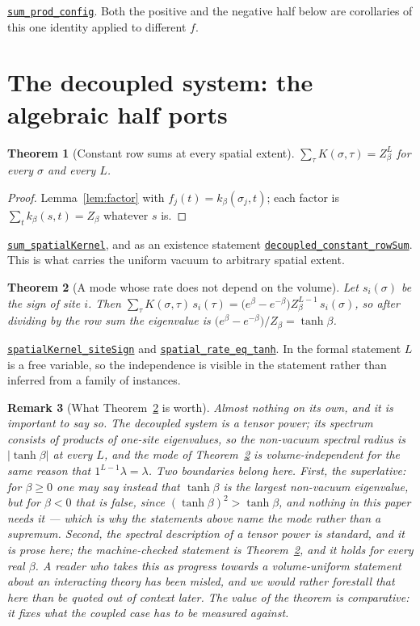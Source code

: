 \documentclass[11pt]{article}
\newtheorem{theorem}{Theorem}[section]
\newtheorem{remark}[theorem]{Remark}
\theoremstyle{definition}
\newcommand{\anchor}{d8187d7f9caa9ce93a58a70a382e98a239942afe}
\newcommand{\osline}[3]{%
  \href{https://github.com/lluiseriksson/THE-ERIKSSON-PROGRAMME/blob/\anchor/YangMills/OS/#1.lean\#L#2}{\nolinkurl{#3}}}
\begin{document}
\osline{SpatialExtent}{77}{sum\_prod\_config}.  Both the positive and the
negative half below are corollaries of this one identity applied to different
$f$.

\section{The decoupled system: the algebraic half ports}

\begin{theorem}[Constant row sums at every spatial extent]\label{thm:rows}
$\displaystyle\sum_{\tau} K(\sigma,\tau) = Z_\beta^{L}$ for every $\sigma$ and
every $L$.
\end{theorem}

\begin{proof}
Lemma~\ref{lem:factor} with $f_j(t)=k_\beta(\sigma_j,t)$; each factor is
$\sum_t k_\beta(s,t)=Z_\beta$ whatever $s$ is.
\end{proof}

\osline{SpatialExtent}{99}{sum\_spatialKernel}, and as an existence statement
\osline{SpatialExtent}{232}{decoupled\_constant\_rowSum}.  This is what carries
the uniform vacuum to arbitrary spatial extent.

\begin{theorem}[A mode whose rate does not depend on the volume]\label{thm:mode}
Let $s_i(\sigma)$ be the sign of site $i$.  Then
$\displaystyle\sum_\tau K(\sigma,\tau)\, s_i(\tau)
 = \bigl(e^{\beta}-e^{-\beta}\bigr) Z_\beta^{L-1}\, s_i(\sigma)$,
so after dividing by the row sum the eigenvalue is
$\bigl(e^{\beta}-e^{-\beta}\bigr)/Z_\beta=\tanh\beta$.
\end{theorem}

\osline{SpatialExtent}{129}{spatialKernel\_siteSign} and
\osline{SpatialExtent}{160}{spatial\_rate\_eq\_tanh}.  In the formal statement
$L$ is a free variable, so the independence is visible in the statement rather
than inferred from a family of instances.

\begin{remark}[What Theorem~\ref{thm:mode} is worth]\label{rem:empty}
Almost nothing on its own, and it is important to say so.  The decoupled system
is a tensor power; its spectrum consists of products of one-site eigenvalues, so
the non-vacuum spectral radius is $|\tanh\beta|$ at every $L$, and the mode of
Theorem~\ref{thm:mode} is volume-independent for the same reason that
$1^{L-1}\lambda=\lambda$.  Two boundaries belong here.  First, the superlative:
for $\beta\ge0$ one may say instead that $\tanh\beta$ is the largest non-vacuum
eigenvalue, but for $\beta<0$ that is false, since $(\tanh\beta)^{2}>\tanh\beta$,
and nothing in this paper needs it --- which is why the statements above name the
mode rather than a supremum.  Second, the spectral description of a tensor power
is standard, and it is prose here; the machine-checked statement is
Theorem~\ref{thm:mode}, and it holds for every real $\beta$.  A reader who takes this as progress towards a
volume-uniform statement about an interacting theory has been misled, and we
would rather forestall that here than be quoted out of context later.  The value
of the theorem is comparative: it fixes what the coupled case has to be measured
against.
\end{remark}
\end{document}
